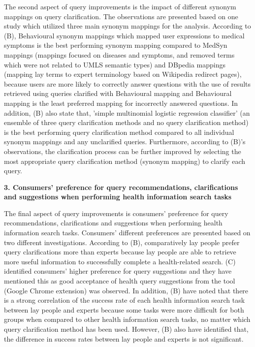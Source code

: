 \documentclass[]{article}
\begin{document}
The second aspect of query improvements is the impact of different synonym mappings on query clarification. The observations are presented based on one study which utilized three main synonym mappings for the analysis. According to (B), Behavioural synonym mappings which mapped user expressions to medical symptoms is the best performing synonym mapping compared to MedSyn mappings (mappings focused on diseases and symptoms, and removed terms which were not related to UMLS semantic types) and DBpedia  mappings (mapping lay terms to expert terminology based on Wikipedia redirect pages), because users are more likely to correctly answer questions with the use of results retrieved using queries clarified with Behavioural mapping and Behavioural mapping is the least preferred mapping for incorrectly answered questions. In addition, (B) also state that, 'simple multinomial logistic regression classifier' (an ensemble of three query clarification methods and no query clarification method) is the best performing query clarification method compared to all individual synonym mappings and any unclarified queries. Furthermore, according to (B)'s observations, the clarification process can be further improved by selecting the most appropriate query clarification method (synonym mapping) to clarify each query.


\textbf{3. Consumers' preference for query recommendations, clarifications and suggestions when performing health information search tasks} 

The final aspect of query improvements is consumers' preference for query recommendations, clarifications and suggestions when performing health information search tasks. Consumers' different preferences are presented based on two different investigations. According to (B), comparatively lay people prefer query clarifications more than experts because lay people are able to retrieve  more useful information to successfully complete a health-related search. (C) identified consumers' higher preference for query suggestions and they have mentioned this as good acceptance of health query suggestions from the tool (Google Chrome extension) was observed. In addition, (B) have noted that there is a strong correlation of the success rate of each health information search task between lay people and experts because some tasks were more difficult for both groups when compared to other health information search tasks, no matter which query clarification method has been used. However, (B) also have identified that, the difference in success rates between lay people and experts is not significant. 
\end{document}
